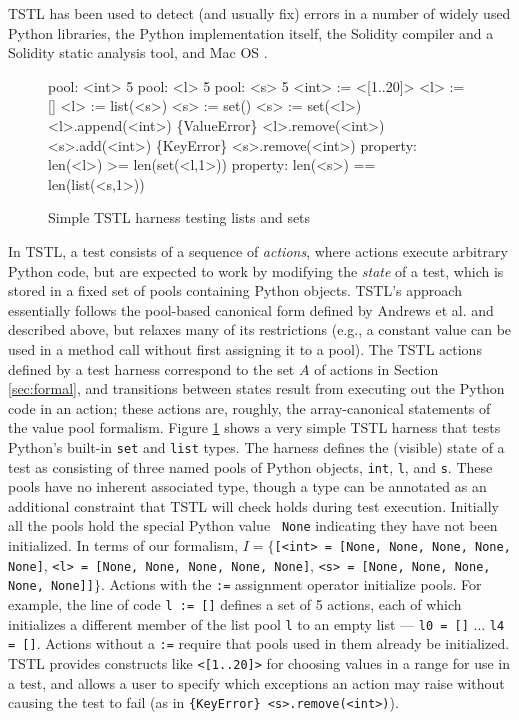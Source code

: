 TSTL has
been used to detect (and usually fix) errors in a number of widely
used Python libraries, the Python implementation itself, the Solidity
compiler and a Solidity static analysis tool, and Mac OS \cite{tstl}.

\begin{figure}
  {\scriptsize
\begin{code}
pool: <int> 5
pool: <l> 5
pool: <s> 5
\vspace{0.1in}
<int> := <[1..20]>
<l> := []
<l> := list(<s>)
<s> := set()
<s> := set(<l>)
\vspace{0.1in}
<l>.append(<int>)
\{ValueError\} <l>.remove(<int>)
<s>.add(<int>)
\{KeyError\} <s>.remove(<int>)
\vspace{0.1in}
property: len(<l>) >= len(set(<l,1>))
property: len(<s>) == len(list(<s,1>))
\end{code}
}
\caption{Simple TSTL harness testing lists and sets}
\label{fig:simple}
\end{figure}

In TSTL, a test consists of a sequence of
\emph{actions}, where actions execute arbitrary Python code, but are
expected to work by modifying the \emph{state} of a test, which is
stored in a fixed set of pools containing Python objects.  TSTL's
approach essentially follows the pool-based canonical form defined by
Andrews et al. and described above, but relaxes many of its restrictions
(e.g., a constant value can be used in a method call without first
assigning it to a pool). The
TSTL actions defined by a test harness correspond to the set $A$ of
actions in Section \ref{sec:formal}, and transitions between states
result from executing out the Python code in an action; these actions
are, roughly, the array-canonical statements of the value pool formalism.  Figure
\ref{fig:simple} shows a very simple TSTL harness that tests Python's
built-in {\tt set} and {\tt list} types.  The harness defines the
(visible) state of a test as consisting of three named pools of Python
objects, {\tt int}, {\tt l}, and {\tt s}.  These pools have no
inherent associated type, though a type can be annotated as an
additional constraint that TSTL will check holds during test
execution.  Initially all the pools hold the special Python value {\tt
  None} indicating they have not been initialized.  In terms of our formalism,
$I = \{${\tt [<int> = [None, None, None, None, None]}, {\tt <l> =
  [None, None, None, None, None]}, {\tt <s> = [None, None, None, None,
  None]]}$\}$.  Actions with the {\tt :=} assignment operator
initialize pools.  For example, the line of code {\tt l := []} defines a set of 5
actions, each of which initializes a different member of the list pool
{\tt l} to an empty list --- {\tt l0 = []} ... {\tt l4 = []}.  Actions
without a {\tt :=} require that pools used in them already be
initialized.  TSTL provides constructs like {\tt <[1..20]>} for
choosing values in a range for use in a test, and allows a user to
specify which exceptions an action may raise without causing the test
to fail (as in {\tt \{KeyError\} <s>.remove(<int>)}).

